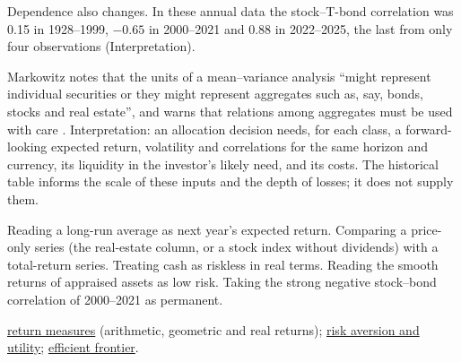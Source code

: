 \begin{qfdefinition}
Dependence also changes. In these annual data the stock--T-bond correlation was 0.15 in 1928--1999, $-0.65$ in 2000--2021 and 0.88 in 2022--2025, the last from only four observations (Interpretation).

 Markowitz notes that the units of a mean--variance analysis ``might represent individual securities or they might represent aggregates such as, say, bonds, stocks and real estate'', and warns that relations among aggregates must be used with care \citep[\emph{Journal of Finance} 7(1), 1952, p.~91 and n.~15]{s6-markowitz}. Interpretation: an allocation decision needs, for each class, a forward-looking expected return, volatility and correlations for the same horizon and currency, its liquidity in the investor's likely need, and its costs. The historical table informs the scale of these inputs and the depth of losses; it does not supply them.

 Reading a long-run average as next year's expected return. Comparing a price-only series (the real-estate column, or a stock index without dividends) with a total-return series. Treating cash as riskless in real terms. Reading the smooth returns of appraised assets as low risk. Taking the strong negative stock--bond correlation of 2000--2021 as permanent.

 \hyperref[def:return-measures]{return measures} (arithmetic, geometric and real returns); \hyperref[def:risk-aversion-utility]{risk aversion and utility}; \hyperref[meth:efficient-frontier]{efficient frontier}.

\end{qfdefinition}

